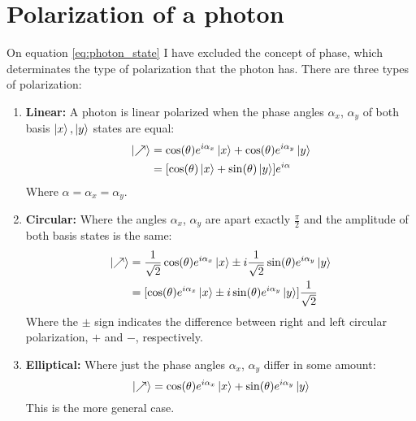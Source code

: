 \chapter{Polarization of a photon}
\label{appendix:optics}
On equation \ref{eq:photon_state} I have excluded the concept of phase, which determinates the type of polarization that the photon has. There are three types of polarization:
\begin{enumerate}
	\item \textbf{Linear:}
	A photon is linear polarized when the phase angles $\alpha_x$, $\alpha_y$ of both basis $\ket{x},\ket{y}$ states are equal:
	\begin{align*}
		\ket{\nearrow} &= \cos(\theta) e^{i\alpha_x}\ket{x} + \cos(\theta)e^{i\alpha_y}\ket{y} \\
		&= [\cos(\theta)\ket{x} + \sin(\theta)\ket{y}]e^{i\alpha}
	\end{align*}
	Where $\alpha=\alpha_x=\alpha_y$.
	
	\item \textbf{Circular:}
	Where the angles $\alpha_x$, $\alpha_y$ are apart exactly $\frac{\pi}{2}$ and the amplitude of both basis states is the same:
	\begin{align*}
		\ket{\nearrow} &= \frac{1}{\sqrt{2}}\cos(\theta)e^{i\alpha_x}\ket{x} \pm i\frac{1}{\sqrt{2}}\sin(\theta)e^{i\alpha_y}\ket{y} \\
					   &= [\cos(\theta)e^{i\alpha_x}\ket{x} \pm i\sin(\theta)e^{i\alpha_y}\ket{y}]\frac{1}{\sqrt{2}}
	\end{align*}
Where the $\pm$ sign indicates the difference between right and left circular polarization, $+$ and $-$, respectively. 

	\item \textbf{Elliptical:}
	Where just the phase angles $\alpha_x$, $\alpha_y$ differ in some amount:
	$$
	\ket{\nearrow} = \cos(\theta)e^{i\alpha_x}\ket{x} + \sin(\theta)e^{i\alpha_y}\ket{y}
	$$
	This is the more general case.
	
\end{enumerate}